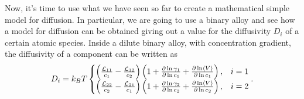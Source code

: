 Now, it's time to use what we have seen so far to create a mathematical simple model for diffusion. In particular, we are going to use a binary alloy and see how a model for diffusion can be obtained giving out a value for the diffusivity $D_i$ of a certain atomic species.
{
    Inside a dilute binary alloy, with concentration gradient, the diffusivity of a component can be written as
    \begin{equation}
        \label{eq:BinaryDiff}
        D_i = k_BT\begin{cases}
            \left( \frac{\mathcal{L}_{11}}{c_1} - \frac{\mathcal{L}_{12}}{c_2} \right)\left( 1 + \pdv{\ln\gamma_1}{\ln c_1} + \pdv{\ln\left\langle V \right\rangle}{\ln c_1} \right), & i = 1\\
            \left( \frac{\mathcal{L}_{22}}{c_2} - \frac{\mathcal{L}_{21}}{c_1} \right)\left( 1 + \pdv{\ln\gamma_2}{\ln c_2} + \pdv{\ln\left\langle V \right\rangle}{\ln c_2} \right), & i = 2
        \end{cases}.
    \end{equation}
}
